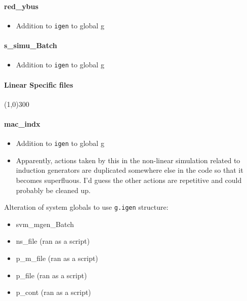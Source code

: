 \documentclass[12pt]{article}
\begin{document}
\paragraph{red\_ybus}
	\begin{itemize}
		\item Addition to \verb|igen| to global g
	\end{itemize}

\paragraph{s\_simu\_Batch}
	\begin{itemize}
		\item Addition to \verb|igen| to global g
	\end{itemize}
			
\pagebreak
\paragraph{Linear Specific files}\line(1,0){300}

\paragraph{mac\_indx}
	\begin{itemize}
		\item Addition to \verb|igen| to global g
		\item Apparently, actions taken by this in the non-linear simulation related to induction generators are duplicated somewhere else in the code so that it becomes superfluous. I'd guess the other actions are repetitive and could probably be cleaned up.
	\end{itemize}
			
			
Alteration of system globals to use \verb|g.igen| structure:

	\begin{itemize}
		\item svm\_mgen\_Batch
		\item ns\_file (ran as a script)
		\item p\_m\_file (ran as a script)
		\item p\_file (ran as a script)
		\item p\_cont (ran as a script)
	\end{itemize}
	
	
\end{document}
